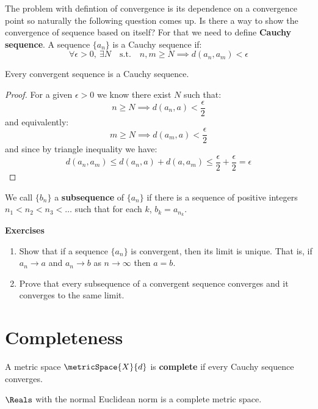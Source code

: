 The problem with defintion of convergence is its dependence on a convergence point so naturally the following question comes up. Is there a way to show the convergence of sequence based on itself?
For that we need to define \textbf{Cauchy sequence}. A sequence \(\{a_n\}\) is a Cauchy sequence if:
\[\forall \epsilon > 0,\: \exists N \quad \mathrm{s.t.} \quad n, m \geq N \implies d(a_n , a_m) < \epsilon \]

\begin{theorem} \label{ConvergenceCauchy}
    Every convergent sequence is a Cauchy sequence.
\end{theorem}

\begin{proof}
    For a given \(\epsilon > 0 \) we know there exist \(N\) such that:
    \[ n \geq N \implies d(a_n,a) < \frac{\epsilon}{2}\]
    and equivalently:
    \[ m \geq N \implies d(a_m,a) < \frac{\epsilon}{2}\]
    and since by triangle inequality we have:
    \[ d(a_n, a_m) \leq d(a_n,a) + d(a,a_m) \leq \frac{\epsilon}{2} + \frac{\epsilon}{2} = \epsilon\]
\end{proof}

\begin{definition} [Subsequence]
    We call \(\{ b_n \}\) a \textbf{subsequence} of \(\{ a_n \}\) if there is a sequence of positive integers \(n_1 < n_2 < n_3 < \dots \) such that for each \(k\), \(b_k = a_{n_k}\).
\end{definition}

{\Large\textbf{Exercises}}
\begin{enumerate}
    \item Show that if a sequence \(\{ a_n \}\) is convergent, then its limit is unique. That is, if \(a_n \to a \) and \(a_n \to b\) as \(n \to \infty\) then \(a = b\).
    \item Prove that every subsequence of a convergent sequence converges and it converges to the same limit.
\end{enumerate}
\newpage

\section{Completeness}
A metric space \(\metricSpace{X}{d}\) is \textbf{complete} if every Cauchy sequence converges.

\begin{proposition}
    \(\Reals\) with the normal Euclidean norm is a complete metric space.
\end{proposition}

